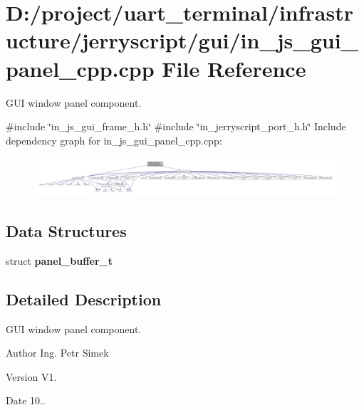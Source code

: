 \section{D\+:/project/uart\+\_\+terminal/infrastructure/jerryscript/gui/in\+\_\+js\+\_\+gui\+\_\+panel\+\_\+cpp.cpp File Reference}
\label{in__js__gui__panel__cpp_8cpp}


G\+UI window panel component.  


{\ttfamily \#include \char`\"{}in\+\_\+js\+\_\+gui\+\_\+frame\+\_\+h.\+h\char`\"{}}\newline
{\ttfamily \#include \char`\"{}in\+\_\+jerryscript\+\_\+port\+\_\+h.\+h\char`\"{}}\newline
Include dependency graph for in\+\_\+js\+\_\+gui\+\_\+panel\+\_\+cpp.\+cpp\+:
\nopagebreak
\begin{figure}[H]
\begin{center}
\leavevmode
\includegraphics[width=350pt]{in__js__gui__panel__cpp_8cpp__incl}
\end{center}
\end{figure}
\subsection*{Data Structures}
\begin{DoxyCompactItemize}
\item 
struct \textbf{ panel\+\_\+buffer\+\_\+t}
\end{DoxyCompactItemize}


\subsection{Detailed Description}
G\+UI window panel component. 

\begin{DoxyAuthor}{Author}
Ing. Petr Simek 
\end{DoxyAuthor}
\begin{DoxyVersion}{Version}
V1. 
\end{DoxyVersion}
\begin{DoxyDate}{Date}
10.. 
\end{DoxyDate}
